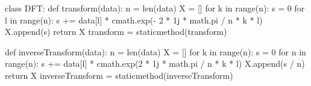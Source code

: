 \begin{python}
class DFT:
    def transform(data):
        n = len(data)
        X = []
        for k in range(n):
            s = 0
            for l in range(n):
                s += data[l] * cmath.exp(- 2 * 1j * math.pi / n * k * l)
            X.append(s)
        return X
    transform = staticmethod(transform)
    
    def inverseTransform(data):
        n = len(data)
        X = []
        for k in range(n):
            s = 0
            for n in range(n):
                s += data[l] * cmath.exp(2 * 1j * math.pi / n * k * l)
            X.append(s / n)
        return X
    inverseTransform = staticmethod(inverseTransform)
\end{python}
